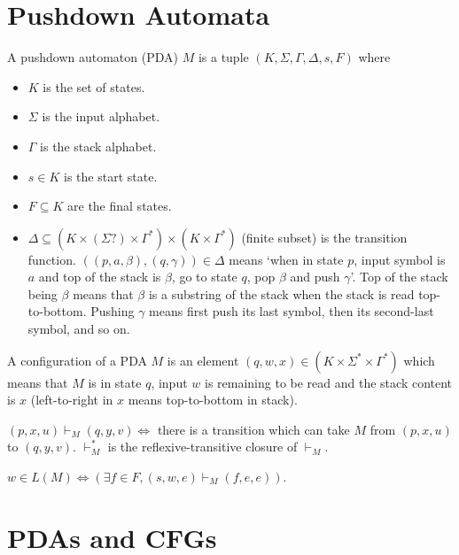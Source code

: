 \section{Pushdown Automata}

\begin{definition}
A pushdown automaton (PDA) $M$ is a tuple $(K, \Sigma, \Gamma, \Delta, s, F)$ where
\begin{itemize}
\item $K$ is the set of states.
\item $\Sigma$ is the input alphabet.
\item $\Gamma$ is the stack alphabet.
\item $s \in K$ is the start state.
\item $F \subseteq K$ are the final states.
\item $\Delta \subseteq (K \times (\Sigma?) \times \Gamma^*) \times (K \times \Gamma^*)$
    (finite subset) is the transition function.
    $((p, a, \beta), (q, \gamma)) \in \Delta$ means `when in state $p$, input symbol is $a$
    and top of the stack is $\beta$, go to state $q$, pop $\beta$ and push $\gamma$'.
    Top of the stack being $\beta$ means that $\beta$ is a substring of the stack when the stack is read top-to-bottom.
    Pushing $\gamma$ means first push its last symbol, then its second-last symbol, and so on.
\end{itemize}
\end{definition}
\begin{definition}
A configuration of a PDA $M$ is an element $(q, w, x) \in (K \times \Sigma^* \times \Gamma^*)$
which means that $M$ is in state $q$, input $w$ is remaining to be read and the stack content is $x$
(left-to-right in $x$ means top-to-bottom in stack).
\end{definition}
\begin{definition}
$(p, x, u) \vdash_M (q, y, v) \iff $ there is a transition
which can take $M$ from $(p, x, u)$ to $(q, y, v)$.
$\vdash_M^*$ is the reflexive-transitive closure of $\vdash_M$.
\end{definition}
\begin{definition}
$w \in L(M) \iff (\exists f \in F, (s, w, e) \vdash_M (f, e, e))$.
\end{definition}

\section{PDAs and CFGs}

